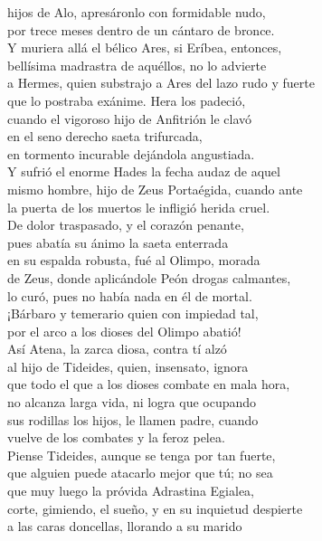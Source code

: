 \documentclass[11pt,twoside]{article}
\begin{document}
hijos de Alo, apresáronlo con formidable nudo,\\
por trece meses dentro de un cántaro de bronce.\\
Y muriera allá el bélico Ares, si Eríbea, entonces,\\
bellísima madrastra de aquéllos, no lo advierte\\
a Hermes, quien substrajo a Ares del lazo rudo y fuerte\\
que lo postraba exánime. Hera los padeció,\\
cuando el vigoroso hijo de Anfitrión le clavó\\
en el seno derecho saeta trifurcada,\\
en tormento incurable dejándola angustiada.\\
Y sufrió el enorme Hades la fecha audaz de aquel\\
mismo hombre, hijo de Zeus Portaégida, cuando ante\\
la puerta de los muertos le infligió herida cruel.\\
De dolor traspasado, y el corazón penante,\\
pues abatía su ánimo la saeta enterrada\\
en su espalda robusta, fué al Olimpo, morada\\
de Zeus, donde aplicándole Peón drogas calmantes,\\
lo curó, pues no había nada en él de mortal.\\
¡Bárbaro y temerario quien con impiedad tal,\\
por el arco a los dioses del Olimpo abatió!\\
Así Atena, la zarca diosa, contra tí alzó\\
al hijo de Tideides, quien, insensato, ignora\\
que todo el que a los dioses combate en mala hora,\\
no alcanza larga vida, ni logra que ocupando\\
sus rodillas los hijos, le llamen padre, cuando\\
vuelve de los combates y la feroz pelea.\\
Piense Tideides, aunque se tenga por tan fuerte,\\
que alguien puede atacarlo mejor que tú; no sea\\
que muy luego la próvida Adrastina Egialea,\\
corte, gimiendo, el sueño, y en su inquietud despierte\\
a las caras doncellas, llorando a su marido\\
\end{document}
